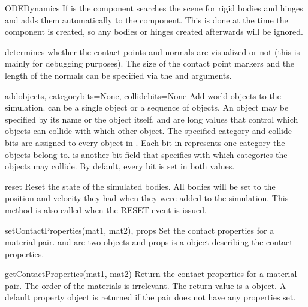 \begin{classdesc}{ODEDynamics}
If  is  the component searches the scene for
rigid bodies and hinges and adds them automatically to the component.
This is done at the time the component is created, so any bodies or
hinges created afterwards will be ignored.

 determines whether the contact points and normals
are visualized or not (this is mainly for debugging purposes).
The size of the contact point markers and the length of the normals
can be specified via the  and 
arguments.
\end{classdesc}

\begin{methoddesc}{add}{objects, categorybits=None, collidebits=None}
Add world objects to the simulation.  can be a single
object or a sequence of objects. An object may be specified by its
name or the object itself.  and 
are long values that control which objects can collide with which
other object. The specified category and collide bits are assigned to every
object in . Each bit in  represents
one category the objects belong to.  is another bit
field that specifies with which categories the objects may collide.
By default, every bit is set in both values.
\end{methoddesc}

\begin{methoddesc}{reset}{}
Reset the state of the simulated bodies. All bodies will be set to the
position and velocity they had when they were added to the simulation.
This method is also called when the RESET event is issued.
\end{methoddesc}

\begin{methoddesc}{setContactProperties}{(mat1, mat2), props}
Set the contact properties for a material pair.  and 
are two  objects and props is a 
object describing the contact properties.
\end{methoddesc}

\begin{methoddesc}{getContactProperties}{(mat1, mat2)}
Return the contact properties for a material pair. The order of the materials
is irrelevant. The return value is
a  object. A default property object is
returned if the pair does not have any properties set.
\end{methoddesc}

